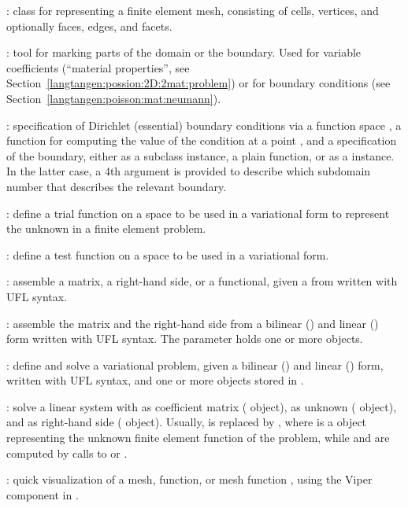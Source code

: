 : class for representing a finite element mesh, consisting of
cells, vertices, and optionally faces, edges, and facets.

: tool for marking parts of the domain or the
boundary.  Used for variable coefficients (``material properties'',
see Section~\ref{langtangen:possion:2D:2mat:problem}) or for boundary
conditions (see Section~\ref{langtangen:poisson:mat:neumann}).\gln

: specification of Dirichlet
(essential) boundary conditions via a function space ,
a function  for computing the value of the condition
at a point , and a specification  of the boundary,
either as a  subclass instance, a plain function, or as
a  instance.  In the latter case, a 4th argument is
provided to describe which subdomain number that describes the relevant
boundary.\gln

: define a trial function on a space 
to be used in a variational form to represent the unknown in a finite
element problem.\gln

: define a test function on a space  to be
used in a variational form.\gln

: assemble a matrix, a right-hand side, or a functional,
given a from  written with UFL syntax.\gln

: assemble the matrix and the right-hand
side from a bilinear () and linear () form written with
UFL syntax. The  parameter holds one or more 
objects.\gln

: define and solve a variational
problem, given a bilinear () and linear () form,
written with UFL syntax, and one or more  objects
stored in .  \gln

: solve a linear system with  as coefficient
matrix ( object),  as unknown ( object),
and  as right-hand side ( object).  Usually, 
is replaced by , where  is a 
object representing the unknown finite element function of the problem,
while  and  are computed by calls to 
or .\gln

: quick visualization of a mesh, function, or mesh function
, using the Viper component in \fenics{}.\gln

